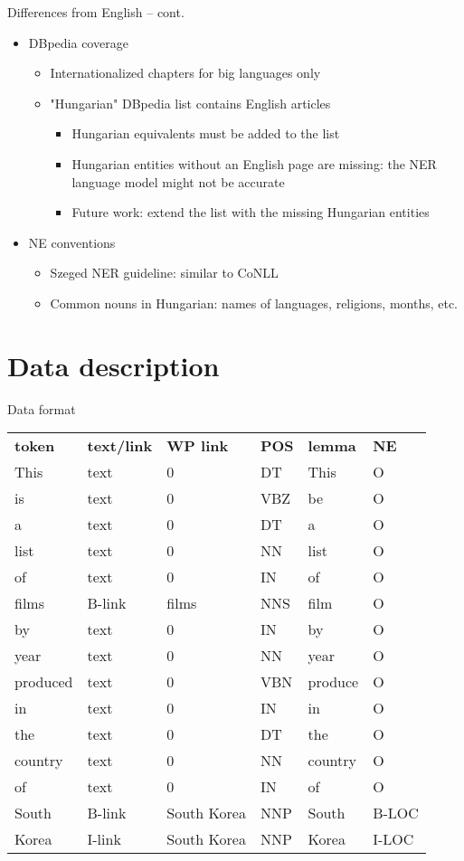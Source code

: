\documentclass[utf8x]{beamer}
\newcommand{\vitem}{\vfill \item}
\begin{document}
\begin{frame}{Differences from English -- cont.}
  \begin{itemize}
  \vitem DBpedia coverage
    \begin{itemize}
    \vitem Internationalized chapters for big languages only
    \vitem "Hungarian" DBpedia list contains English articles %
      \begin{itemize}
      \vitem Hungarian equivalents must be added to the list %
      \vitem Hungarian entities without an English page are missing:
             the NER language model might not be accurate
      \vitem Future work: extend the list with the missing Hungarian entities
      \end{itemize}
    \end{itemize}
  \vitem NE conventions
    \begin{itemize}
    \vitem Szeged NER guideline: similar to CoNLL
    \vitem Common nouns in Hungarian: names of languages, religions, months, etc.
    \end{itemize}
  \end{itemize}
\end{frame}

\section{Data description}

\begin{frame}{Data format}

\begin{tabular}{llllll}
\textbf{token} & \textbf{text/link} & \textbf{WP link} & \textbf{POS} & \textbf{lemma} & \textbf{NE} \\
This & text & 0 &    DT &   This & O \\
is &   text & 0 &    VBZ &  be &   O \\
a &    text & 0 &    DT &   a  &    O\\
list & text & 0 &    NN &   list  & O\\
of &   text & 0 &    IN &   of &     O\\
films  & B-link & films &  NNS &  film & O\\
by &   text & 0 &    IN &   by &     O\\
year & text & 0 &    NN &   year & O\\
produced & text & 0 &    VBN &  produce & O\\
in &   text & 0 &    IN &   in &     O\\
the &  text & 0 &    DT &   the &   O\\
country &text & 0 &    NN &   country &O\\
of &   text & 0 &    IN &   of &     O\\
South &  B-link & South Korea &  NNP &  South  &B-LOC\\
Korea &  I-link & South Korea &  NNP &  Korea   & I-LOC\\
\end{tabular}

\end{frame}
\end{document}
